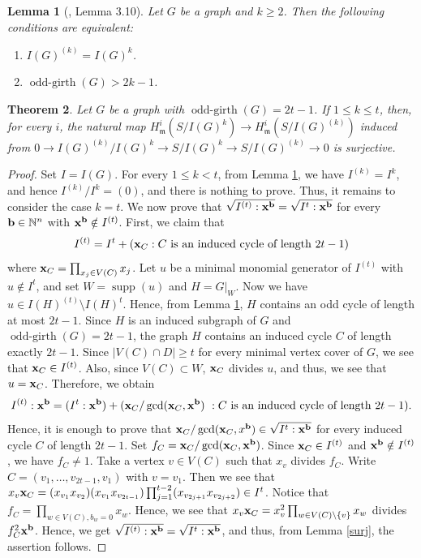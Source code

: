 \documentclass[12pt]{amsart}
\newtheorem{thm}{Theorem}[section]
\newtheorem{lemma}[thm]{Lemma}
\theoremstyle{definition}
\theoremstyle{remark}
\DeclareMathOperator{\supp}{supp}
\DeclareMathOperator{\ogirth}{odd-girth}
\begin{document}
\begin{lemma}[\cite{rty2011}, Lemma 3.10]\label{char of symb=ord}
Let $G$ be a graph and $k\geq2$. Then the following conditions are equivalent:
\begin{enumerate}
\item $I(G)^{(k)}=I(G)^{k}$. 
\item $\ogirth(G)>2k-1$. 
\end{enumerate}
\end{lemma}

\begin{thm}\label{local coho}
Let $G$ be a graph with $\ogirth(G)=2t-1$. If $1\leq k\leq t$, then, for every $i$, the natural map $H_{\mathfrak{m}}^{i}(S/I(G)^{k})\rightarrow H_{\mathfrak{m}}^{i}(S/I(G)^{(k)})$ induced from $0\rightarrow I(G)^{(k)}/I(G)^{k}\rightarrow S/I(G)^{k}\rightarrow S/I(G)^{(k)}\rightarrow0$ is surjective.  
\end{thm}
\begin{proof}
Set $I=I(G)$. For every $1\leq k<t$, from Lemma \ref{char of symb=ord}, we have $I^{(k)}=I^{k}$, and hence $I^{(k)}/I^{k}=(0)$,  and there is nothing to prove. Thus, it remains to consider the case $k=t$. We now prove that $\sqrt{I^{(t)}:{\bf x}^{\bf b}} = \sqrt{I^t:{\bf x}^{\bf b}}$ for every ${\bf b}\in\mathbb{N}^{n}$ with ${\bf x}^{\bf b}\notin I^{(t)}$. First, we claim that $$I^{(t)} = I^{t}+ ({\bf x}_C: C\text{ is an induced cycle of length }2t-1)$$ where ${\bf x}_C=\prod_{x_j\in V(C)}x_j$. Let $u$ be a minimal monomial generator of $I^{(t)}$ with $u\notin I^t$, and set $W=\supp(u)$ and $H=G|_{W}$. Now we have  $u\in I(H)^{(t)}\setminus I(H)^{t}$. Hence, from Lemma \ref{char of symb=ord}, $H$ contains an odd cycle of length at most $2t-1$. Since $H$ is an induced subgraph of $G$ and $\ogirth(G)=2t-1$, the graph $H$ contains an induced cycle $C$ of length exactly $2t-1$. Since $|V(C)\cap D|\geq t$ for every minimal vertex cover of $G$, we see that ${\bf x}_{C}\in I^{(t)}$. Also, since $V(C)\subset W$, ${\bf x}_{C}$ divides $u$, and thus, we see that $u={\bf x}_{C}$.
Therefore, we obtain 
$$I^{(t)}:{\bf x}^{\bf b}=(I^{t}:{\bf x}^{\bf b})+({\bf x}_{C}/\gcd({\bf x}_{C}, {\bf x}^{\bf b})\,\,: C\mbox{ is an induced cycle of length }2t-1).$$
Hence, it is enough to prove that ${\bf x}_C/\gcd({\bf x}_C,x^{\bf b}) \in \sqrt{I^t:{\bf x}^{\bf b}}$ for every induced cycle $C$ of length $2t-1$. Set $f_{C}={\bf x}_{C}/\gcd({\bf x}_{C},{\bf x}^{\bf b})$. Since ${\bf x}_C\in I^{(t)}$ and ${\bf x}^{\bf b}\notin I^{(t)}$, we have $f_C\neq1$. Take a vertex $v\in V(C)$ such that $x_v$ divides $f_C$. Write $C=(v_{1},\ldots,v_{2t-1},v_{1})$ with $v=v_{1}$. Then we see that $x_v{\bf x}_C = (x_{v_{1}}x_{v_{2}})(x_{v_{1}}x_{v_{2t-1}}) \prod_{j=1}^{t-2}(x_{v_{2j+1}}x_{v_{2j+2}}) \in I^t$. Notice that $f_{C}=\prod_{w\in V(C), b_{w}=0}x_{w}$. Hence, we see that $x_{v}{\bf x}_{C}=x_{v}^{2}\prod_{w\in V(C)\setminus\{v\}}x_{w}$ divides $f_{C}^{2}{\bf x}^{\bf b}$. Hence, we get $\sqrt{I^{(t)}:{\bf x}^{\bf b}} = \sqrt{I^t:{\bf x}^{\bf b}}$, and thus, from Lemma \ref{surj}, the assertion follows. 
\end{proof}
\end{document}
